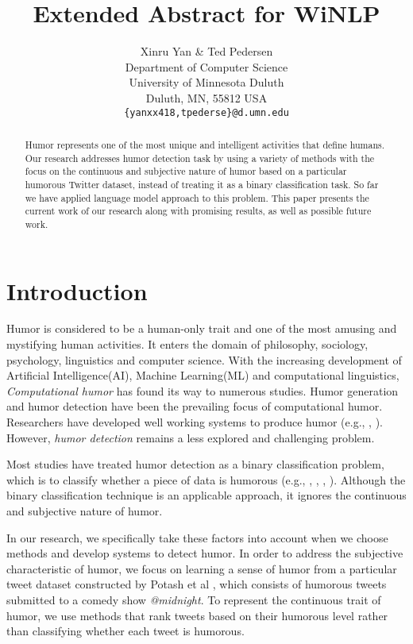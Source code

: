 \documentclass[11pt,a4paper]{article}
\title{Extended Abstract for WiNLP}
\author{Xinru Yan \& Ted Pedersen\\
  Department of Computer Science \\ University of Minnesota Duluth \\ Duluth, MN, 55812 USA \\
  {\tt \{yanxx418,tpederse\}@d.umn.edu}}
\date{}
\begin{document}
\maketitle
\begin{abstract}
Humor represents one of the most unique and intelligent activities that define humans. Our research addresses humor detection task by using a variety of methods with the focus on the continuous and subjective nature of humor based on a particular humorous Twitter dataset, instead of treating it as a binary classification task. So far we have applied language model approach to this problem. This paper presents the current work of our research along with promising results, as well as possible future work.
\end{abstract}

\section{Introduction}
Humor is considered to be a human-only trait and one of the most amusing and mystifying human activities. It enters the domain of philosophy, sociology, psychology, linguistics and computer science. With the increasing development of Artificial Intelligence(AI), Machine Learning(ML) and computational linguistics, \textit{Computational humor} has found its way to numerous studies. Humor generation and humor detection have been the prevailing focus of computational humor. Researchers have developed well working systems to produce humor (e.g., \cite{StockS03}, \cite{ozbal2012computational}). However, \textit{humor detection} remains a less explored and challenging problem. 

Most studies have treated humor detection as a binary classification problem, which is to classify whether a piece of data is humorous (e.g., \cite{Learning:To:Laugh}, \cite{Recognizing:Humor:On:Twitter}, \cite{ShahafHM15}, \cite{MillerG15}). Although the binary classification technique is an applicable approach, it ignores the continuous and subjective nature of humor. 

In our research, we specifically take these factors into account when we choose methods and develop systems to detect humor. In order to address the subjective characteristic of humor, we focus on learning a sense of humor from a particular tweet dataset constructed by Potash et al \cite{2016hashtagwars}, which consists of humorous tweets submitted to a comedy show \textit{@midnight}. To represent the continuous trait of humor, we use methods that rank tweets based on their humorous level rather than classifying whether each tweet is humorous.   
 
\end{document}
